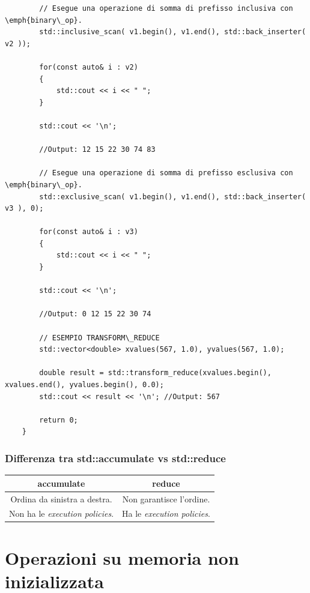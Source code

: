 \begin{lstlisting}
		// Esegue una operazione di somma di prefisso inclusiva con \emph{binary\_op}.
		std::inclusive_scan( v1.begin(), v1.end(), std::back_inserter( v2 ));
		
		for(const auto& i : v2)
		{
			std::cout << i << " ";
		}
		
		std::cout << '\n';
		
		//Output: 12 15 22 30 74 83
		
		// Esegue una operazione di somma di prefisso esclusiva con \emph{binary\_op}.
		std::exclusive_scan( v1.begin(), v1.end(), std::back_inserter( v3 ), 0);
		
		for(const auto& i : v3)
		{
			std::cout << i << " ";
		}
		
		std::cout << '\n';
		
		//Output: 0 12 15 22 30 74
		
		// ESEMPIO TRANSFORM\_REDUCE
		std::vector<double> xvalues(567, 1.0), yvalues(567, 1.0);
		
		double result = std::transform_reduce(xvalues.begin(), xvalues.end(), yvalues.begin(), 0.0);
		std::cout << result << '\n'; //Output: 567
		
		return 0;
	}
\end{lstlisting}


\subsubsection{Differenza tra std::accumulate vs std::reduce}

\begin{tabular}{|c|c|}
	\hline
	\textbf{accumulate} & \textbf{reduce} \\
	\hline
	\textsf{\small Ordina da sinistra a destra.} & \textsf{\small Non garantisce l'ordine.} \\
	\hline
	\textsf{\small Non ha le \emph{execution policies}.} & \textsf{\small Ha le \emph{execution policies}.} \\
	\hline
\end{tabular}



\newpage

\section{Operazioni su memoria non inizializzata}

